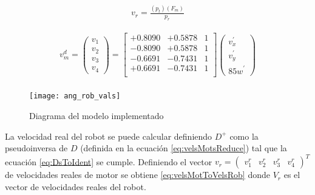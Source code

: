 \begin{gather}
	v_r = \frac{\left( p_t \right) \left( F_m \right) } { p_r} \label{eq:vel_real_mots}
\end{gather}


\begin{gather}
	v_m^d = 
		\left(\begin{array}{c}
			v_1 \\ v_2 \\ v_3 \\ v_4 
		\end{array}\right)
		= 
		\begin{bmatrix}
			+0.8090 & +0.5878 & 1 \\
			-0.8090 & +0.5878 & 1 \\
			-0.6691 & -0.7431 & 1 \\
			+0.6691 & -0.7431 & 1 \\
		\end{bmatrix}
		\left(\begin{array}{c}
			v_x^{'}  \\ v_y^{'}  \\ {85 w}^{'} 
		\end{array} \right) \label{eq:velsMots_vals} \\
\end{gather}

\begin{figure}
	\centering
		\texttt{[image: ang\_rob\_vals]}
	\caption{Diagrama del modelo implementado}
	\label{fig:angs_vals}
\end{figure}

La velocidad real del robot se puede calcular definiendo \( D^{+} \) como la pseudoinversa de $D$ (definida en la ecuación \eqref{eq:velsMotsReduce}) tal que la ecuación \eqref{eq:DsToIdent} se cumple. Definiendo el vector \( v_{r} = \begin{pmatrix}v_1^{r} & v_2^{r} & v_3^{r} & v_4^{r} \end{pmatrix}^{T} \) de velocidades reales de motor se obtiene \eqref{eq:velsMotToVelsRob} donde $V_r$ es el vector de velocidades reales del robot.

